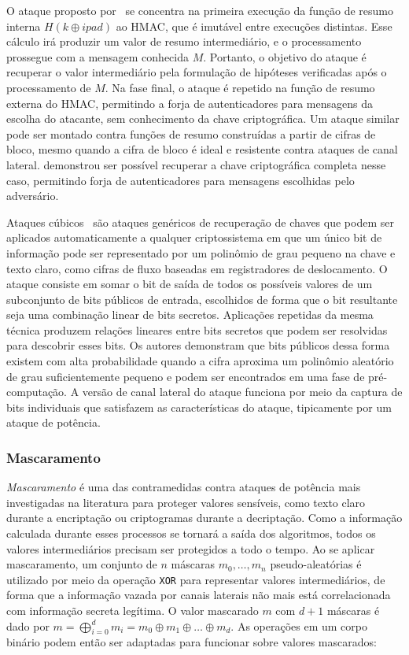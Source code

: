 O ataque proposto por~\cite{McEvoyTMM07} se concentra na primeira execução da função de resumo interna $H(k \oplus ipad)$ ao HMAC, que é imutável entre execuções distintas. Esse cálculo irá produzir um valor de resumo intermediário, e o processamento prossegue com a mensagem conhecida $M$.
Portanto, o objetivo do ataque é recuperar o valor intermediário pela formulação de hipóteses verificadas após o processamento de $M$.
Na fase final, o ataque é repetido na função de resumo externa do HMAC, permitindo a forja de autenticadores para mensagens da escolha do atacante,
sem conhecimento da chave criptográfica. Um ataque similar pode ser montado contra funções de resumo construídas a partir de cifras de bloco,
mesmo quando a cifra de bloco é ideal e resistente contra ataques de canal lateral. \cite{Okeya06} demonstrou ser possível recuperar
a chave criptográfica completa nesse caso, permitindo forja de autenticadores para mensagens escolhidas pelo adversário.

Ataques cúbicos~\cite{DinurS12} são ataques genéricos de recuperação de chaves que podem ser aplicados automaticamente
a qualquer criptossistema em que um único bit de informação pode ser representado por um polinômio de grau
pequeno na chave e texto claro, como cifras de fluxo baseadas em registradores de deslocamento.
O ataque consiste em somar o bit de saída de todos os possíveis valores de um subconjunto de bits públicos de entrada,
escolhidos de forma que o bit resultante seja uma combinação linear de bits secretos. Aplicações repetidas da mesma técnica produzem
relações lineares entre bits secretos que podem ser resolvidas para descobrir esses bits.
Os autores demonstram que bits públicos dessa forma existem com alta probabilidade quando a cifra aproxima um polinômio aleatório de grau suficientemente pequeno
e podem ser encontrados em uma fase de pré-computação. A versão de canal lateral do ataque funciona por meio da captura de bits individuais que satisfazem
as características do ataque, tipicamente por um ataque de potência.

\subsubsection*{Mascaramento}

\emph{Mascaramento} é uma das contramedidas contra ataques de potência mais investigadas na literatura para proteger valores sensíveis, como texto claro durante a encriptação ou criptogramas durante a decriptação. Como a informação calculada durante esses processos se tornará a saída dos algoritmos, todos os valores intermediários precisam ser protegidos a todo o tempo. Ao se aplicar mascaramento, um conjunto de $n$ máscaras $m_0,\ldots,m_n$ pseudo-aleatórias é utilizado por meio da operação \texttt{XOR} para representar valores intermediários, de forma que a informação vazada por canais laterais não mais está correlacionada com informação secreta legítima. O valor mascarado $m$ com $d+1$ máscaras é dado por $m = \bigoplus\limits_{i=0}^{d}m_i  = m_0 \oplus m_1 \oplus \ldots \oplus m_d$. As operações em um corpo binário podem então ser adaptadas para funcionar sobre valores mascarados: 

